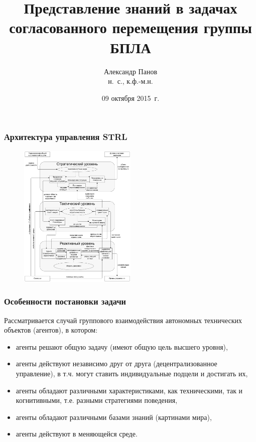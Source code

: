 \documentclass[default]{beamer}
\begin{document}
	
	\title[Представление знаний, группа БПЛА]{Представление знаний в задачах согласованного перемещения группы БПЛА}
	\author[Панов]{Александр Панов\\н.~с., к.ф.-м.н.}
	\date{09 октября 2015~г.} 
	
	\begin{frame}
		\titlepage
	\end{frame}
	
	\begin{frame}
		\frametitle{Архитектура управления STRL}
		
		\begin{figure}
			\includegraphics[width=0.5\textwidth]{strl/architecture.pdf}
		\end{figure}
	\end{frame}
	\begin{frame}
		\frametitle{Особенности постановки задачи}
		
		Рассматривается случай группового взаимодействия автономных технических объектов (агентов), в котором:
		\begin{itemize}
			\item агенты решают общую задачу (имеют общую цель высшего уровня),
			\item агенты действуют независимо друг от друга (децентрализованное управление), в т.ч. могут ставить индивидуальные подцели и достигать их,
			\item агенты обладают различными характеристиками, как техническими, так и когнитивными, т.е. разными стратегиями поведения,
			\item агенты обладают различными базами знаний (картинами мира),
			\item агенты действуют в меняющейся среде.
		\end{itemize}

	\end{frame}
\end{document}
